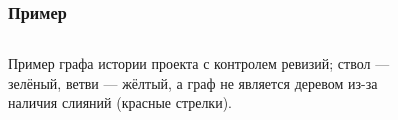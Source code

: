 \documentclass[aspectratio=169]{beamer}
\begin{document}
\begin{frame}
\frametitle{Пример}
\medskip
\begin{columns}
Пример графа истории проекта с контролем ревизий; ствол --- зелёный, ветви --- жёлтый, а граф не является деревом из-за наличия слияний (красные стрелки).
\begin{figure}
\centering
{}
\end{figure}
\end{columns}
\end{frame}
\end{document}
